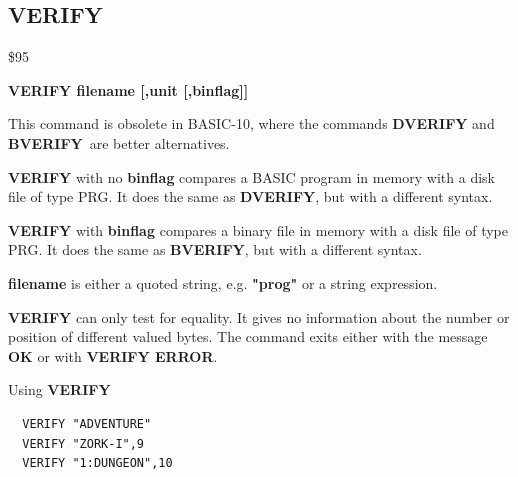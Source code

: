 \subsection{VERIFY}
\begin{description}[leftmargin=2cm,style=nextline]
\item [Token:] \$95
\item [Format:] {\bf VERIFY filename [,unit [,binflag]] }
\item [Usage:]
   This command is obsolete in BASIC-10, where the commands
   {\bf DVERIFY} and {\bf BVERIFY} are better alternatives.

   {\bf VERIFY} with no {\bf binflag} compares a BASIC program
   in memory with a disk file of type PRG.
   It does the same as {\bf DVERIFY}, but with a different syntax.

   {\bf VERIFY} with {\bf binflag} compares a binary file
   in memory with a disk file of type PRG.
   It does the same as {\bf BVERIFY}, but with a different syntax.

   {\bf filename} is either a quoted string, e.g. {\bf "prog"} or
   a string expression.

   \unitdefinition

\item [Remarks:]
   {\bf VERIFY} can only test for equality. It gives no information
   about the number or position of different valued bytes.
   The command exits either with the message {\bf OK}
   or with {\bf VERIFY ERROR}.

\item [Example:] Using {\bf VERIFY}
\begin{tcolorbox}[colback=black,coltext=white]
\verbatimfont{\codefont}
\begin{verbatim}
  VERIFY "ADVENTURE"
  VERIFY "ZORK-I",9
  VERIFY "1:DUNGEON",10
\end{verbatim}
\end{tcolorbox}
\end{description}


\newpage
